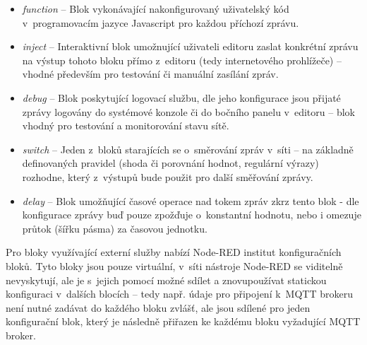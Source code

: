 \begin{itemize}
    \item\emph{function} -- Blok vykonávající nakonfigurovaný uživatelský kód v~programovacím jazyce Javascript pro
    každou příchozí zprávu.
    \item\emph{inject} -- Interaktivní blok umožnující uživateli editoru zaslat konkrétní zprávu na výstup tohoto bloku
    přímo z~editoru (tedy internetového prohlížeče) -- vhodné především pro testování či manuální zasílání zpráv.
    \item\emph{debug} -- Blok poskytující logovací službu, dle jeho konfigurace jsou přijaté zprávy logovány do systémové konzole či do
    bočního panelu v~editoru -- blok vhodný pro testování a monitorování stavu sítě.
    \item\emph{switch} -- Jeden z~bloků starajících se o~směrování zpráv v~síti -- na základně definovaných pravidel
    (shoda či porovnání hodnot, regulární výrazy) rozhodne, který z~výstupů bude použit pro další směřování zprávy.
    \item\emph{delay} -- Blok umožňující časové operace nad tokem zpráv zkrz tento blok - dle konfigurace zprávy buď
    pouze zpožďuje o~konstantní hodnotu, nebo i omezuje průtok (šířku pásma) za časovou jednotku.
\end{itemize}

Pro bloky využívající externí služby nabízí Node-RED institut konfiguračních bloků.
Tyto bloky jsou pouze virtuální, v~síti nástroje Node-RED se viditelně nevyskytují, ale je
s~jejich pomocí možné sdílet a znovupoužívat statickou konfiguraci v~dalších blocích -- tedy např. údaje pro
připojení k~MQTT brokeru není nutné zadávat do každého bloku zvlášť, ale jsou sdílené pro jeden konfigurační blok,
který je následně přiřazen ke každému bloku vyžadující MQTT broker.

